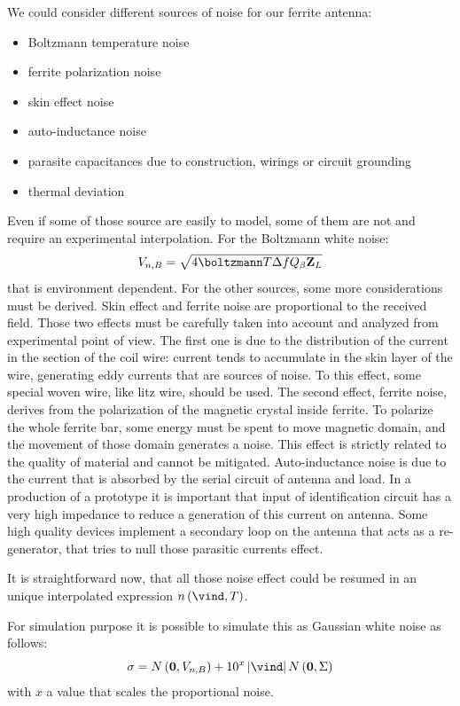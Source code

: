 We could consider different sources of noise for our ferrite antenna:
\begin{itemize}
\item Boltzmann temperature noise
\item ferrite polarization noise
\item skin effect noise
\item auto-inductance noise
\item parasite capacitances due to construction, wirings or circuit grounding
\item thermal deviation
\end{itemize}

Even if some of those source are easily to model, some of them are not and require an experimental interpolation. For the Boltzmann white noise\citep{markov1975antennas}:
\[
V_{n,B} = \sqrt{4 \boltzmann T \Delta f Q_{\beta} \mathbf{Z}_{L}}
\]
that is environment dependent. For the other sources, some more considerations must be derived. Skin effect and ferrite noise are proportional to the received field. 
Those two effects must be carefully taken into account and analyzed from experimental point of view. The first one is due to the distribution of the current in the section of the coil wire: current tends to accumulate in the skin layer of the wire, generating eddy currents that are sources of noise\citep{ramo2008fields}. To this effect, some special woven wire, like litz wire, should be used.
The second effect, ferrite noise, derives from the polarization of the magnetic crystal inside ferrite. To polarize the whole ferrite bar, some energy must be spent to move magnetic domain, and the movement of those domain generates a noise\citep{snelling1988soft}. This effect is strictly related to the quality of material and cannot be mitigated.
Auto-inductance noise is due to the current that is absorbed by the serial circuit of antenna and load. In a production of a prototype it is important that input of identification circuit has a very high impedance to reduce a generation of this current on antenna. Some high quality devices implement a secondary loop on the antenna that acts as a re-generator, that tries to null those parasitic currents effect.

It is straightforward now, that all those noise effect could be resumed in an unique interpolated expression ${n \braces{\vind,T}}$.

For simulation purpose it is possible to simulate this as Gaussian white noise as follows:
\begin{equation}
\sigma = N\braces{\mathbf{0}, V_{n,B}} + 10^{x} \abs{\vind} N\braces{\mathbf{0}, \Sigma}
\end{equation}
with $x$ a value that scales the proportional noise.